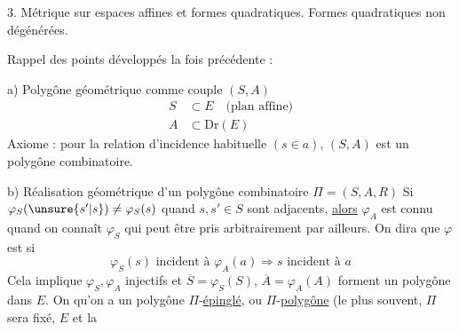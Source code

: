 3. Métrique sur espaces affines et formes quadratiques.
Formes quadratiques non dégénérées.

Rappel des points développés la fois précédente :

a) Polygône géométrique comme couple $(S,A)$
\[
\begin{aligned}
S&\subset E\quad\text{(plan affine)}\\
A&\subset\mathrm{Dr}(E)
\end{aligned}
\]
Axiome : pour la relation d'incidence habituelle
$(s\in a)$, $(S,A)$ est un polygône combinatoire.

b) Réalisation géométrique d'un polygône
combinatoire $\Pi=(S,A,R)$
Si $\varphi_S(\unsure{s'|s})\ne\varphi_S(s)$ quand $s,s'\in S$ sont adjacents, \uline{alors}
$\varphi_A$ est connu quand on connaît $\varphi_S$ qui peut être
pris arbitrairement par ailleurs. On dira que
$\varphi$ est   si
\[
\varphi_S(s)\text{ incident à }\varphi_A(a)\Longrightarrow s\text{ incident à }a
\]
Cela implique $\varphi_S,\varphi_A$ injectifs et $\overline S=\varphi_S(S)$, $\overline A=\varphi_A(A)$
forment un  polygône dans $E$. On  
qu'on a un polygône $\Pi$-\uline{épinglé}, ou $\Pi$-\uline{polygône} (le plus souvent, $\Pi$ sera fixé, $E$ et la
